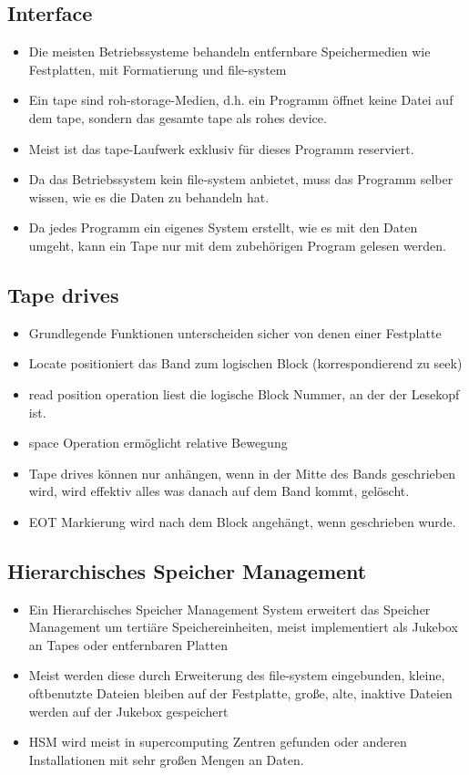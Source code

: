 \documentclass[a4paper]{scrreprt}
\begin{document}
\subsection{Interface}
\begin{itemize}
	\item Die meisten Betriebssysteme behandeln entfernbare Speichermedien wie Festplatten, mit Formatierung und file-system
	\item Ein tape sind roh-storage-Medien, d.h. ein Programm öffnet keine Datei auf dem tape, sondern das gesamte tape als rohes device.
	\item Meist ist das tape-Laufwerk exklusiv für dieses Programm reserviert.
	\item Da das Betriebssystem kein file-system anbietet, muss das Programm selber wissen, wie es die Daten zu behandeln hat.
	\item Da jedes Programm ein eigenes System erstellt, wie es mit den Daten umgeht, kann ein Tape nur mit dem zubehörigen Program gelesen werden.
\end{itemize}
\subsection{Tape drives}
\begin{itemize}
	\item Grundlegende Funktionen unterscheiden sicher von denen einer Festplatte
	\item Locate positioniert das Band zum logischen Block (korrespondierend zu seek)
	\item read position operation liest die logische Block Nummer, an der der Lesekopf ist.
	\item space Operation ermöglicht relative Bewegung
	\item Tape drives können nur anhängen, wenn in der Mitte des Bands geschrieben wird, wird effektiv alles was danach auf dem Band kommt, gelöscht.
	\item EOT Markierung wird nach dem Block angehängt, wenn geschrieben wurde.
\end{itemize}
\subsection{Hierarchisches Speicher Management}
\begin{itemize}
	\item Ein Hierarchisches Speicher Management System erweitert das Speicher Management um tertiäre Speichereinheiten, meist implementiert als Jukebox an Tapes oder entfernbaren Platten
	\item Meist werden diese durch Erweiterung des file-system eingebunden, kleine, oftbenutzte Dateien bleiben auf der Festplatte, große, alte, inaktive Dateien werden auf der Jukebox gespeichert
	\item HSM wird meist in supercomputing Zentren gefunden oder anderen Installationen mit sehr großen Mengen an Daten.
\end{itemize}
\end{document}
